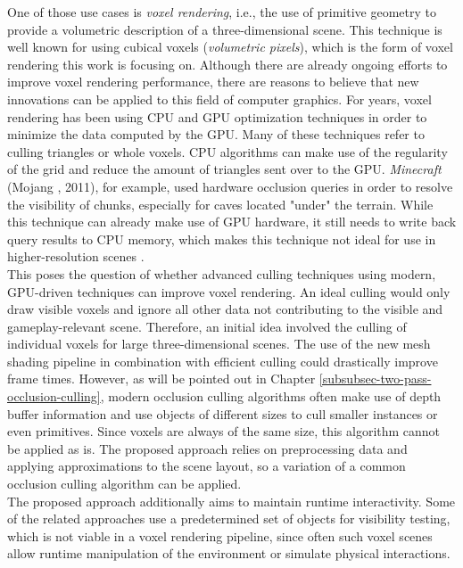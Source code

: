 \noindent
One of those use cases is \emph{voxel rendering}, i.e., the use of primitive geometry to provide a 
volumetric description of a three-dimensional scene. This technique is well known for using 
cubical voxels (\emph{volumetric pixels}), which is the form of voxel rendering this work is 
focusing on. Although there are already ongoing efforts to improve voxel rendering performance, there are 
reasons to believe that new innovations can be applied to this field of computer graphics. For years, 
voxel rendering has been using \ac{CPU} and \ac{GPU} optimization techniques in order to minimize 
the data computed by the \ac{GPU}. Many of these techniques refer to culling triangles or whole voxels. 
\ac{CPU} algorithms can make use of the regularity of the grid and reduce the amount of triangles sent 
over to the \ac{GPU}. \emph{Minecraft} (Mojang \cite{Mojang2024}, 2011), for example, used hardware 
occlusion queries in order to resolve the visibility of chunks, especially for caves located "under" the 
terrain. While this technique can already make use of \ac{GPU} hardware, it still needs to write back 
query results to \ac{CPU} memory, which makes this technique not ideal for use in higher-resolution 
scenes \cite{TommosBlog2014}. \\

\noindent
This poses the question of whether advanced culling techniques using modern, \ac{GPU}-driven techniques can 
improve voxel rendering. An ideal culling would only draw visible voxels and ignore all other data 
not contributing to the visible and gameplay-relevant scene. Therefore, an initial idea involved 
the culling of individual voxels for large three-dimensional scenes. The use of the new mesh shading 
pipeline in combination with efficient culling could drastically improve frame times. However, as will be 
pointed out in Chapter \ref{subsubsec-two-pass-occlusion-culling}, modern occlusion culling algorithms 
often make use of depth buffer information and use objects of different sizes to cull smaller instances 
or even primitives. Since voxels are always of the same size, this algorithm cannot be applied as is. 
The proposed approach relies on preprocessing data and applying approximations to the scene layout, 
so a variation of a common occlusion culling algorithm can be applied. \\

\noindent
The proposed approach additionally aims to maintain runtime interactivity. Some of the related approaches 
use a predetermined set of objects for visibility testing, which is not viable in a voxel rendering pipeline, 
since often such voxel scenes allow runtime manipulation of the environment or simulate physical interactions. 

